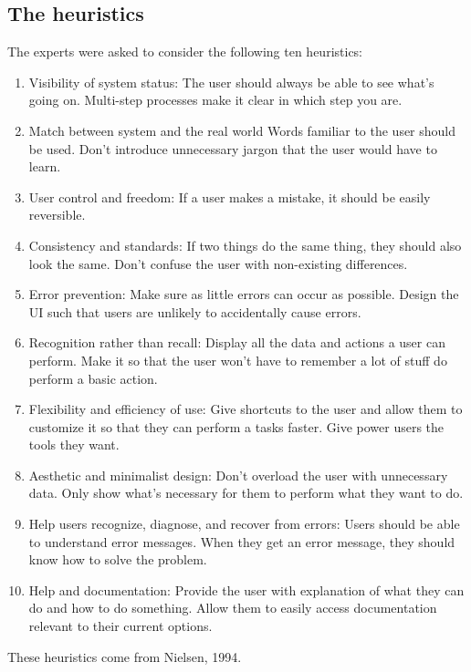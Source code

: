 \subsection{The heuristics}
The experts were asked to consider the following ten heuristics:
\begin{enumerate}
\item Visibility of system status:
The user should always be able to see what's going on. Multi-step processes make it clear in which step you are.\cite{video-slides}

\item Match between system and the real world
Words familiar to the user should be used. Don't introduce unnecessary jargon that the user would have to learn.\cite{video-slides}

\item User control and freedom:
If a user makes a mistake, it should be easily reversible.\cite{video-slides}

\item Consistency and standards:
If two things do the same thing, they should also look the same. Don't confuse the user with non-existing differences.\cite{video-slides}

\item Error prevention:
Make sure as little errors can occur as possible. Design the UI such that users are unlikely to accidentally cause errors.\cite{video-slides}

\item Recognition rather than recall:
Display all the data and actions a user can perform. Make it so that the user won't have to remember a lot of stuff do perform a basic action.\cite{video-slides}

\item Flexibility and efficiency of use:
Give shortcuts to the user and allow them to customize it so that they can perform a tasks faster. Give power users the tools they want.\cite{video-slides}

\item Aesthetic and minimalist design:
Don't overload the user with unnecessary data. Only show what's necessary for them to perform what they want to do.\cite{video-slides}

\item Help users recognize, diagnose, and recover from errors:
Users should be able to understand error messages. When they get an error message, they should know how to solve the problem. \cite{video-slides}

\item Help and documentation:
Provide the user with explanation of what they can do and how to do something. Allow them to easily access documentation relevant to their current options. 
\cite{video-slides}
\end{enumerate}
\hfill \break
These heuristics come from Nielsen, 1994\cite{nielsen1994heuristic}.

